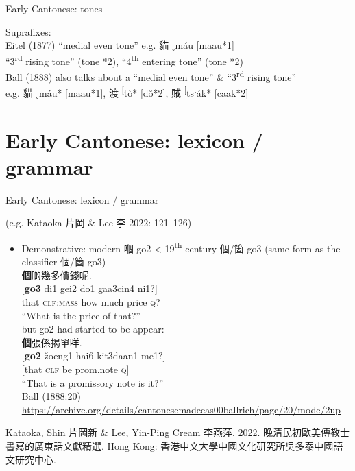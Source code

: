 \documentclass{beamer}
\begin{document}
\begin{frame}[fragile]{Early Cantonese: tones}

Suprafixes:\\
\bigskip
Eitel (1877) \enquote{medial even tone} e.g. 貓 ˳máu [maau*1]\\ \enquote{3\textsuperscript{rd} rising tone} (tone *2), \enquote{4\textsuperscript{th} entering tone} (tone *2)\\
\bigskip
Ball (1888) also talks about a \enquote{medial even tone} \&  \enquote{3\textsuperscript{rd} rising tone}\\
e.g. 貓 ˳máu* [maau*1], 渡 \textsuperscript{[}tò* [dŏ*2], 賊 \textsuperscript{[}ts\textquoteleft ák* [caak*2]

\end{frame}

\section{Early Cantonese: lexicon / grammar}

\begin{frame}[fragile]{Early Cantonese: lexicon / grammar}

{\scriptsize(e.g. Kataoka 片岡 \& Lee 李 2022: 121–126)}
\begin{itemize}
    \item Demonstrative: modern 嗰 go2 < 19\textsuperscript{th} century 個/箇 go3 (same form as the classifier 個/箇 go3)\\
    \smallskip
    {\footnotesize 
    \textbf{個}啲幾多價錢呢.\\
    {[\textbf{go3} di1 gei2 do1 gaa3cin4 ni1?]}\\
    {that \textsc{clf:mass} how much price \textsc{q}?}\\
    \enquote{What is the price of that?}\\
    \smallskip
    but go2 had started to be appear:\\
    \textbf{個}張係揭單咩.\\
    {[\textbf{go2} žoeng1 hai6 kit3daan1 me1?]}\\
    {[that \textsc{clf} be prom.note \textsc{q}]}\\
    \enquote{That is a promissory note is it?}\\
    }
	{\tiny Ball (1888:20) \url{https://archive.org/details/cantonesemadeeas00ballrich/page/20/mode/2up}}
\end{itemize}

\vfill {} {\tiny 
  Kataoka, Shin 片岡新 \& Lee, Yin-Ping Cream 李燕萍. 2022. 晚清民初歐美傳教士書寫的廣東話文獻精選. Hong Kong: 香港中文大學中國文化研究所吳多泰中國語文研究中心.\par} 
\end{frame}
\end{document}
